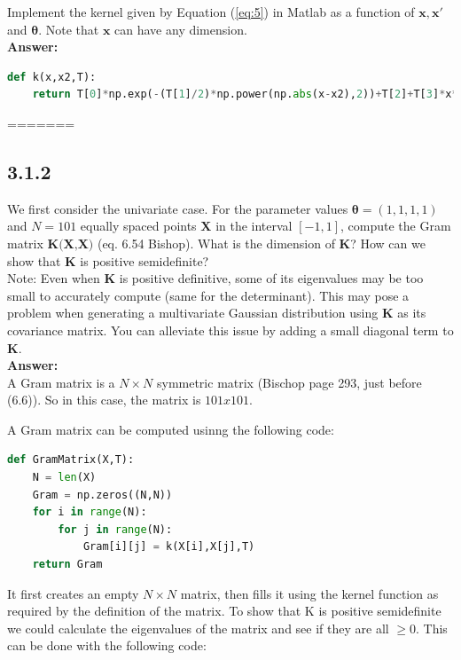 \documentclass[a4paper]{article}
\begin{document}
Implement the kernel given by Equation (\ref{eq:5}) in Matlab as a function of $\textbf{x}, \textbf{x}'$ and $\boldsymbol{\theta}$. Note that $\textbf{x}$ can have any dimension.\\

\textbf{Answer:}\\


\begin{lstlisting}[language=Python]
def k(x,x2,T):
    return T[0]*np.exp(-(T[1]/2)*np.power(np.abs(x-x2),2))+T[2]+T[3]*x*x2
\end{lstlisting}
=======



\subsection*{3.1.2}

We first consider the univariate case. For the parameter values $\boldsymbol{\theta} = (1,1,1,1)$ and $N = 101$ equally spaced points $\textbf{X}$ in the interval $[-1,1]$, compute the Gram matrix $\textbf{K(X,X)}$ (eq. 6.54 Bishop). What is the dimension of \textbf{K}? How can we show that \textbf{K} is positive semidefinite?\\



Note: Even when \textbf{K} is positive definitive, some of its eigenvalues may be too small to accurately compute (same for the determinant). This may pose a problem when generating a multivariate Gaussian distribution using \textbf{K} as its covariance matrix. You can alleviate this issue by adding a small diagonal term to \textbf{K}.\\


\textbf{Answer:}\\



A Gram matrix is a $N \times N$ symmetric matrix (Bischop page 293, just before (6.6)). So in this case, the matrix is $101 x 101$.

A Gram matrix can be computed usinng the following code:

\begin{lstlisting}[language=Python]
def GramMatrix(X,T):
    N = len(X)
    Gram = np.zeros((N,N))
    for i in range(N):
        for j in range(N):
            Gram[i][j] = k(X[i],X[j],T)
    return Gram
\end{lstlisting}

It first creates an empty $N \times N$ matrix, then fills it using the kernel function as required by the definition of the matrix. To show that K is positive semidefinite we could calculate the eigenvalues of the matrix and see if they are all $\geq 0$. This can be done with the following code:
\end{document}
